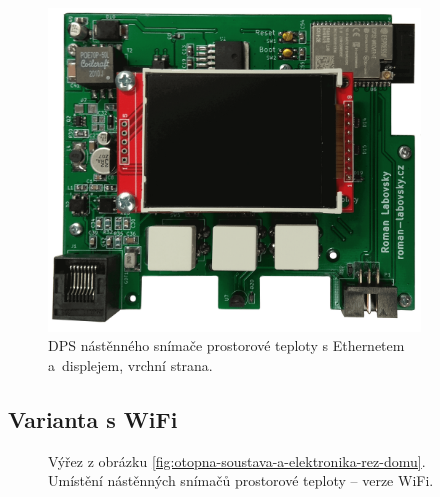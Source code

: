 \begin{figure}[H]
    \centering
    \includegraphics[width=0.88\textwidth]{images/nastenny-snimac-prostorove-teploty-ethernet/dps-nastenny-snimac-prostorove-teploty-ethernet-vrchni-cast-displej.png}
    \caption{DPS nástěnného snímače prostorové teploty s Ethernetem a~displejem, vrchní strana.}
    \label{fig:dps-nastenny-snimac-prostorove-teploty-ethernet-vrchni-cast-displej}
\end{figure}






\subsection{Varianta s WiFi}
\label{sec:wifi-modul}


\begin{figure}[H]
   \centering
   \def\svgwidth{0.5\columnwidth}
   
    \caption[Umístění nástěnných snímačů prostorové teploty – verze WiFi.]{Výřez z obrázku \ref{fig:otopna-soustava-a-elektronika-rez-domu}. Umístění nástěnných snímačů prostorové teploty – verze WiFi.}
    \label{fig:vyrez-nastenny-snimac-prostorove-teploty-wifi}
\end{figure}

